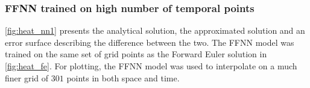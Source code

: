 \subsubsection{FFNN trained on high number of temporal points}


\autoref{fig:heat_nn1} presents the analytical solution, the approximated solution and an error surface describing the difference between the two. The FFNN model was trained on the same set of grid points as the Forward Euler solution in \autoref{fig:heat_fe}. For plotting, the FFNN model was used to interpolate on a much finer grid of $301$ points in both space and time. 

\begin{figure}[H]
\centering
{}
\qquad
{}

\end{figure}
